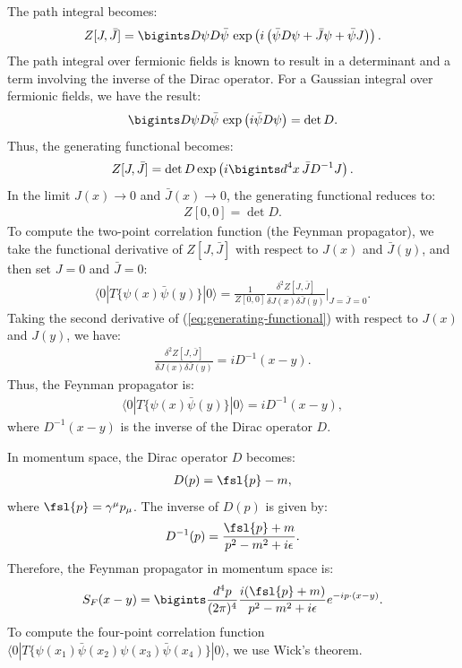 The path integral becomes:
\begin{align}
    Z[J, \bar{J}] = \bigints D\psi D\bar{\psi} \, \exp \left( i \left( \bar{\psi} D \psi + \bar{J} \psi + \bar{\psi} J \right) \right). \label{eq:path-integral}
\end{align}
The path integral over fermionic fields is known to result in a determinant and a term involving the inverse of the Dirac operator. For a Gaussian integral over fermionic fields, we have the result:
\begin{align}
    \bigints D\psi D\bar{\psi} \, \exp \left( i \bar{\psi} D \psi \right) = \det D.
\end{align}
Thus, the generating functional becomes:
\begin{align}
    Z[J, \bar{J}] = \det D \exp \left( i \bigints d^4x \, \bar{J} D^{-1} J \right).\label{eq:generating-functional}
\end{align}
In the limit $J(x) \to 0$ and $\bar{J}(x) \to 0$, the generating functional reduces to:
\begin{align*}
    Z[0, 0] = \det D.
\end{align*}
To compute the two-point correlation function (the Feynman propagator), we take the functional derivative of $Z[J, \bar{J}]$ with respect to $J(x)$ and $\bar{J}(y)$, and then set $J = 0$ and $\bar{J} = 0$:
\begin{align*}
    \langle 0 | T \{ \psi(x) \bar{\psi}(y) \} | 0 \rangle = \frac{1}{Z[0, 0]} \frac{\delta^2 Z[J, \bar{J}]}{\delta J(x) \delta \bar{J}(y)} \bigg|_{J = \bar{J} = 0}.
\end{align*}
Taking the second derivative of (\ref{eq:generating-functional}) with respect to $J(x)$ and $J(y)$, we have:
\begin{align}
    \frac{\delta^2 Z[J, \bar{J}]}{\delta J(x) \delta \bar{J}(y)} = i D^{-1}(x - y).
\end{align}
Thus, the Feynman propagator is:
\begin{align*}
    \langle 0 | T \{ \psi(x) \bar{\psi}(y) \} | 0 \rangle = i D^{-1}(x - y),
\end{align*}
where $D^{-1}(x - y)$ is the inverse of the Dirac operator $D$.

In momentum space, the Dirac operator $D$ becomes:
\begin{align*}
    D(p) = \fsl{p} - m,
\end{align*}
where $\fsl{p} = \gamma^\mu p_\mu$. The inverse of $D(p)$ is given by:
\begin{align*}
    D^{-1}(p) = \frac{\fsl{p} + m}{p^2 - m^2 + i\epsilon}.
\end{align*}
Therefore, the Feynman propagator in momentum space is:
\begin{align}
    S_F(x - y) = \bigints \frac{d^4 p}{(2\pi)^4} \frac{i (\fsl{p} + m)}{p^2 - m^2 + i\epsilon} e^{-ip \cdot (x - y)}.\label{eq:feynmann-propagator-fermion}
\end{align}
To compute the four-point correlation function $\langle 0 | T \{ \psi(x_1) \bar{\psi}(x_2) \psi(x_3) \bar{\psi}(x_4) \} | 0 \rangle$, we use Wick’s theorem.

